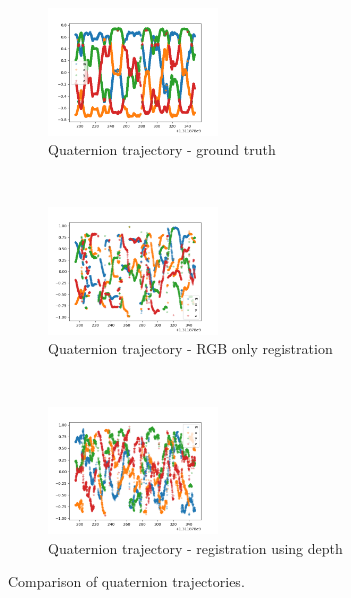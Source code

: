 \documentclass[12pt,a4paper]{article}
\begin{document}
\begin{figure}[t!]
  \centering
  \begin{subfigure}[t]{0.3\textwidth}
  \centering
    \includegraphics[width=45mm]{reg_graphs/180_no-rot-d/qtrj_gt.PNG}
  \caption{Quaternion trajectory - ground truth}
  \end{subfigure} %
  ~
  \begin{subfigure}[t]{0.3\textwidth}
  \centering
    \includegraphics[width=45mm]{reg_graphs/180_no-rot-d/qtrj_rgb.PNG}
  \caption{Quaternion trajectory - RGB only registration}
  \end{subfigure}%
  ~
  \begin{subfigure}[t]{0.3\textwidth}
  \centering
    \includegraphics[width=45mm]{reg_graphs/180_no-rot-d/qtrj_d.PNG}
  \caption{Quaternion trajectory - registration using depth}
  \end{subfigure}
  \caption{Comparison of quaternion trajectories.}
\end{figure}
\end{document}
